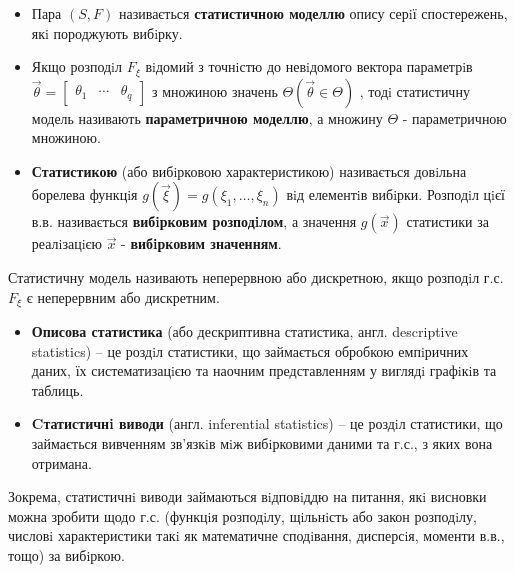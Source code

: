\begin{itemize}
\item Пара $(S,F)$ називається \textbf{\color{javadocblue} статистичною моделлю} опису серiї спостережень, якi породжують вибiрку. \item Якщо розподiл $F_{\xi}$ вiдомий з точнiстю до невiдомого вектора параметрiв $\overrightarrow{\theta} = \begin{bmatrix}
 \theta_1 & \cdots & \theta_q
\end{bmatrix}$ з множиною значень
$\Theta (\overrightarrow{\theta} \in \Theta)$
, тодi статистичну модель називають \textbf{\color{javadocblue} параметричною моделлю},
а множину $\Theta$ - параметричною множиною.
\item \textbf{\color{javared} Статистикою} (або вибiрковою характеристикою) називається довiльна борелева функцiя $g(\overrightarrow{\xi}) = g(\xi_1, \dots , \xi_n)$ вiд елементiв вибiрки. Розподiл цiєї в.в. називається
\textbf{\color{javadocblue} вибiрковим розподiлом}, а значення $g(\overrightarrow{x})$  статистики за реалiзацiєю $\overrightarrow{x}$ - \textbf{ \color{javadocblue} вибiрковим
значенням}.
\end{itemize}
Статистичну модель називають неперервною або дискретною, якщо розподiл г.с. $F_\xi$ є
неперервним або дискретним.
\begin{itemize}
\item
\textbf{\color{javared} Описова статистика} (або дескриптивна статистика, англ. descriptive statistics) – це
роздiл статистики, що займається обробкою емпiричних даних, їх систематизацiєю та
наочним представленням у виглядi графiкiв та таблиць.
\item
\textbf{\color{javared} Cтатистичнi виводи} (англ. inferential statistics) – це роздiл статистики, що займається
вивченням зв’язкiв мiж вибiрковими даними та г.с., з яких вона отримана.
\end{itemize}
Зокрема, статистичнi виводи займаються вiдповiддю на питання, якi висновки можна зробити
щодо г.с. (функцiя розподiлу, щiльнiсть або закон розподiлу, числовi характеристики такi як
математичне сподiвання, дисперсiя, моменти в.в., тощо) за вибiркою.
